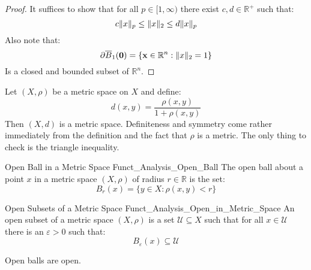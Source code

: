         \begin{proof}
            It suffices to show that for all
            $p\in[1,\infty)$ there exist
            $c,d\in\mathbb{R}^{+}$ such that:
            \begin{equation}
                c\lVert x\rVert_{p}\leq\lVert x\rVert_{2}\leq{d}\lVert x\rVert_{p}
            \end{equation}
            Also note that:
            \begin{equation}
                \partial{\overline{B}_{1}(\mathbf{0})}=
                \{\mathbf{x}\in\mathbb{R}^{n}:\lVert x\rVert_{2}=1\}
            \end{equation}
            Is a closed and bounded subset of $\mathbb{R}^{n}$.
        \end{proof}
        \begin{lexample}
            Let $(X,\rho)$ be a metric space on $X$ and define:
            \begin{equation}
                d(x,y)=\frac{\rho(x,y)}{1+\rho(x,y)}
            \end{equation}
            Then $(X,d)$ is a metric space. Definiteness
            and symmetry come rather immediately from the
            definition and the fact that $\rho$ is a metric.
            The only thing to check is the
            triangle inequality.
        \end{lexample}
        \begin{ldefinition}{Open Ball in a Metric Space}
              {Funct_Analysis_Open_Ball}
            The open ball about a point $x$ in a metric space
            $(X,\rho)$ of radius $r\in\mathbb{R}$ is the set:
            \begin{equation}
                B_{r}(x)=\{y\in{X}:\rho(x,y)<r\}
            \end{equation}
        \end{ldefinition}
        \begin{ldefinition}{Open Subsets of a Metric Space}
              {Funct_Analysis_Open_in_Metric_Space}
            An open subset of a metric space $(X,\rho)$ is a set
            $\mathcal{U}\subseteq{X}$ such that for all
            $x\in\mathcal{U}$ there is an $\varepsilon>0$
            such that:
            \begin{equation}
                B_{\varepsilon}(x)\subseteq\mathcal{U}
            \end{equation}
        \end{ldefinition}
        \begin{theorem}
            Open balls are open.
        \end{theorem}
